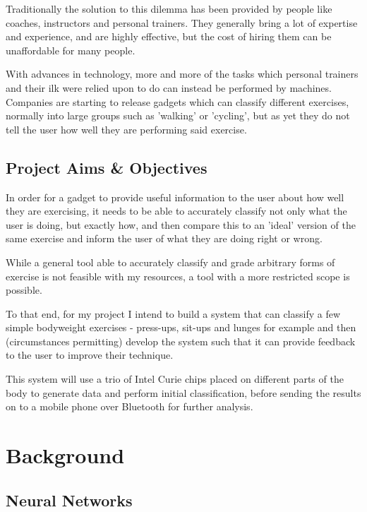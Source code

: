 \documentclass[a4paper]{article}
\begin{document}
Traditionally the solution to this dilemma has been provided by people like coaches, instructors and personal trainers. They generally bring a lot of expertise and experience, and are highly effective, but the cost of hiring them can be unaffordable for many people.

With advances in technology, more and more of the tasks which personal trainers and their ilk were relied upon to do can instead be performed by machines. Companies are starting to release gadgets which can classify different exercises, normally into large groups such as 'walking' or 'cycling', but as yet they do not tell the user how well they are performing said exercise.

\subsection{Project Aims \& Objectives}%

In order for a gadget to provide useful information to the user about how well they are exercising, it needs to be able to accurately classify not only what the user is doing, but exactly how, and then compare this to an 'ideal' version of the same exercise and inform the user of what they are doing right or wrong.

While a general tool able to accurately classify and grade arbitrary forms of exercise is not feasible with my resources, a tool with a more restricted scope is possible.

To that end, for my project I intend to build a system that can classify a few simple bodyweight exercises - press-ups, sit-ups and lunges for example and then (circumstances permitting) develop the system such that it can provide feedback to the user to improve their technique.

This system will use a trio of Intel Curie chips placed on different parts of the body to generate data and perform initial classification, before sending the results on to a mobile phone over Bluetooth for further analysis.

\newpage
\section{Background}

\subsection{Neural Networks}%
\end{document}
